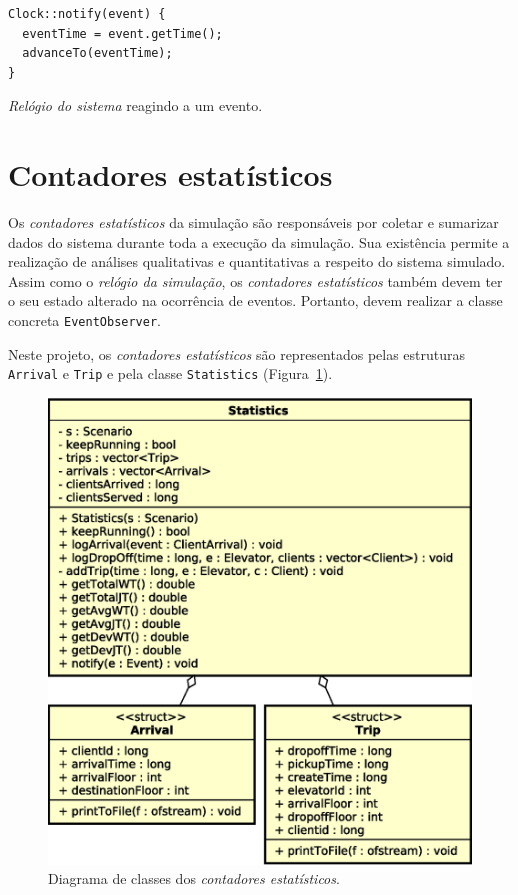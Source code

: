 \begin{algorithm}[htb!]
  \centering
    \begin{verbatim}
Clock::notify(event) {
  eventTime = event.getTime();
  advanceTo(eventTime);
}
    \end{verbatim}
  \caption{\label{alg:advanceto}\textit{Relógio do sistema} reagindo a um evento.}
\end{algorithm}

\section{Contadores estatísticos}

Os \textit{contadores estatísticos} da simulação são responsáveis por coletar e
sumarizar dados do sistema durante toda a execução da simulação. Sua existência
permite a realização de análises qualitativas e quantitativas a respeito do
sistema simulado. Assim como o \textit{relógio da simulação}, os
\textit{contadores estatísticos} também devem ter o seu estado alterado na
ocorrência de eventos. Portanto, devem realizar a classe concreta
\texttt{EventObserver}.

Neste projeto, os \textit{contadores estatísticos} são
representados pelas estruturas \texttt{Arrival} e \texttt{Trip} e pela classe
\texttt{Statistics} (Figura~\ref{fig:diagram:statistics}).

\begin{figure}[htb!]
  \centering
  \includegraphics[scale=0.6]{img/Statistics}
  \caption{Diagrama de classes dos \textit{contadores estatísticos}.}
\label{fig:diagram:statistics}
\end{figure}

